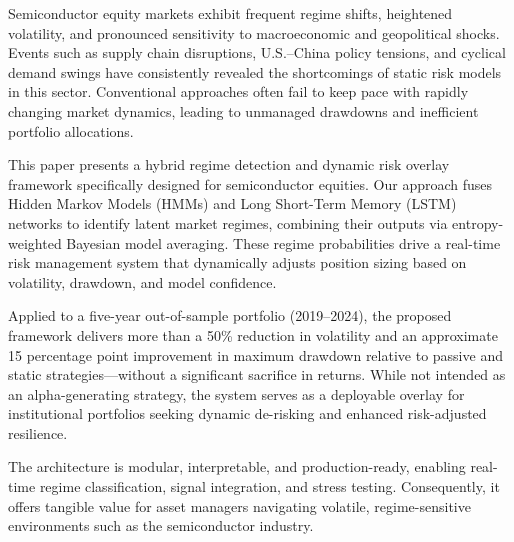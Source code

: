 Semiconductor equity markets exhibit frequent regime shifts, heightened volatility, and pronounced sensitivity to macroeconomic and geopolitical shocks. Events such as supply chain disruptions, U.S.--China policy tensions, and cyclical demand swings have consistently revealed the shortcomings of static risk models in this sector. Conventional approaches often fail to keep pace with rapidly changing market dynamics, leading to unmanaged drawdowns and inefficient portfolio allocations.

This paper presents a hybrid regime detection and dynamic risk overlay framework specifically designed for semiconductor equities. Our approach fuses Hidden Markov Models (HMMs) and Long Short-Term Memory (LSTM) networks to identify latent market regimes, combining their outputs via entropy-weighted Bayesian model averaging. These regime probabilities drive a real-time risk management system that dynamically adjusts position sizing based on volatility, drawdown, and model confidence.

Applied to a five-year out-of-sample portfolio (2019--2024), the proposed framework delivers more than a 50\% reduction in volatility and an approximate 15 percentage point improvement in maximum drawdown relative to passive and static strategies---without a significant sacrifice in returns. While not intended as an alpha-generating strategy, the system serves as a deployable overlay for institutional portfolios seeking dynamic de-risking and enhanced risk-adjusted resilience.

The architecture is modular, interpretable, and production-ready, enabling real-time regime classification, signal integration, and stress testing. Consequently, it offers tangible value for asset managers navigating volatile, regime-sensitive environments such as the semiconductor industry.
